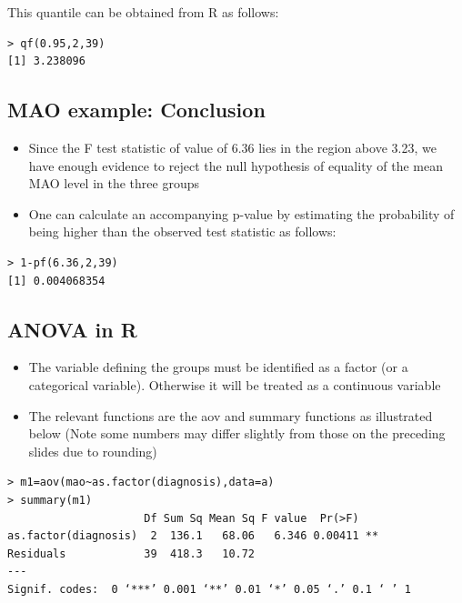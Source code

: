 \documentclass[
]{book}
\providecommand{\tightlist}{%
  \setlength{\itemsep}{0pt}\setlength{\parskip}{0pt}}
\begin{document}
This quantile can be obtained from R as follows:

\begin{verbatim}
> qf(0.95,2,39)
[1] 3.238096
\end{verbatim}

\hypertarget{mao-example-conclusion}{%
\subsection{MAO example: Conclusion}\label{mao-example-conclusion}}

\begin{itemize}
\tightlist
\item
  Since the F test statistic of value of 6.36 lies in the region above 3.23, we have enough evidence to reject the null hypothesis of equality of the mean MAO level in the three groups
\item
  One can calculate an accompanying p-value by estimating the probability of being higher than the observed test statistic as follows:
\end{itemize}

\begin{verbatim}
> 1-pf(6.36,2,39)
[1] 0.004068354
\end{verbatim}

\hypertarget{anova-in-r}{%
\subsection{ANOVA in R}\label{anova-in-r}}

\begin{itemize}
\tightlist
\item
  The variable defining the groups must be identified as a factor (or a categorical variable). Otherwise it will be treated as a continuous variable
\item
  The relevant functions are the aov and summary functions as illustrated below (Note some numbers may differ slightly from those on the preceding slides due to rounding)
\end{itemize}

\begin{verbatim}
> m1=aov(mao~as.factor(diagnosis),data=a)
> summary(m1)
                     Df Sum Sq Mean Sq F value  Pr(>F)   
as.factor(diagnosis)  2  136.1   68.06   6.346 0.00411 **
Residuals            39  418.3   10.72                   
---
Signif. codes:  0 ‘***’ 0.001 ‘**’ 0.01 ‘*’ 0.05 ‘.’ 0.1 ‘ ’ 1
\end{verbatim}
\end{document}
